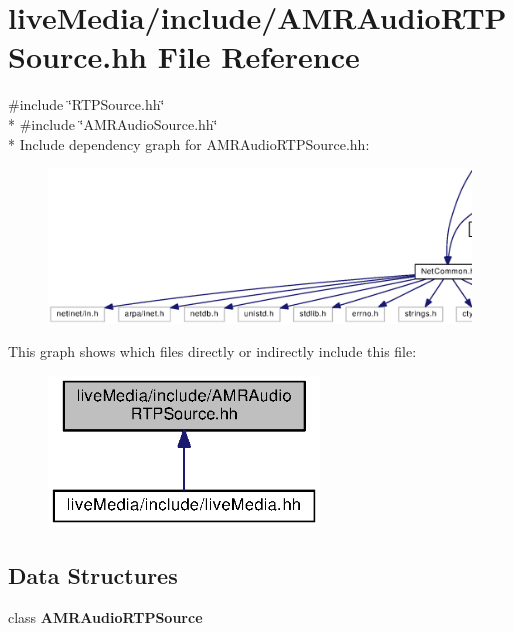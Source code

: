 \section{live\+Media/include/\+A\+M\+R\+Audio\+R\+T\+P\+Source.hh File Reference}
\label{AMRAudioRTPSource_8hh}
{\ttfamily \#include \char`\"{}R\+T\+P\+Source.\+hh\char`\"{}}\\*
{\ttfamily \#include \char`\"{}A\+M\+R\+Audio\+Source.\+hh\char`\"{}}\\*
Include dependency graph for A\+M\+R\+Audio\+R\+T\+P\+Source.\+hh\+:
\nopagebreak
\begin{figure}[H]
\begin{center}
\leavevmode
\includegraphics[width=350pt]{AMRAudioRTPSource_8hh__incl}
\end{center}
\end{figure}
This graph shows which files directly or indirectly include this file\+:
\nopagebreak
\begin{figure}[H]
\begin{center}
\leavevmode
\includegraphics[width=204pt]{AMRAudioRTPSource_8hh__dep__incl}
\end{center}
\end{figure}
\subsection*{Data Structures}
\begin{DoxyCompactItemize}
\item 
class {\bf A\+M\+R\+Audio\+R\+T\+P\+Source}
\end{DoxyCompactItemize}

